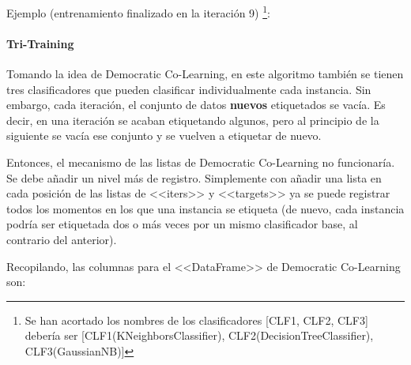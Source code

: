 Ejemplo (entrenamiento finalizado en la iteración 9) \footnote{Se han acortado los nombres de los clasificadores [CLF1, CLF2, CLF3]
debería ser [CLF1(KNeighborsClassifier), CLF2(DecisionTreeClassifier),
CLF3(GaussianNB)]}:
\begin{table}[H]
    \caption{Ejemplo de DataFrame de Democratic Co-Learning}
\end{table}


\paragraph{Tri-Training}
Tomando la idea de Democratic Co-Learning, en este algoritmo también se tienen
tres clasificadores que pueden clasificar individualmente cada instancia. Sin
embargo, cada iteración, el conjunto de datos \textbf{nuevos} etiquetados se
vacía. Es decir, en una iteración se acaban etiquetando algunos, pero al
principio de la siguiente se vacía ese conjunto y se vuelven a etiquetar de
nuevo.

Entonces, el mecanismo de las listas de Democratic Co-Learning no funcionaría.
Se debe añadir un nivel más de registro. Simplemente con añadir una lista en
cada posición de las listas de <<iters>> y <<targets>> ya se puede registrar
todos los momentos en los que una instancia se etiqueta (de nuevo, cada
instancia podría ser etiquetada dos o más veces por un mismo clasificador base,
al contrario del anterior).


Recopilando, las columnas para el <<DataFrame>> de Democratic Co-Learning son:

